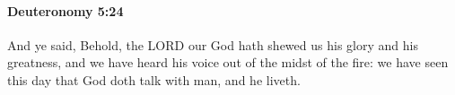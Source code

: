 
		\paragraph{Deuteronomy 5:24} %
			\label{DEUTERONOMY-5-24}

			And ye said, Behold, the LORD our God hath shewed us his glory and his greatness, and we have heard his voice out of the midst of the fire: we have seen this day that God doth talk with man, and he liveth.


